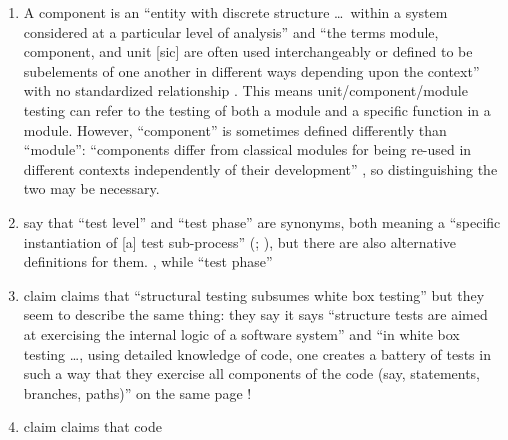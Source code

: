 \begin{enumerate}
    \item %
          A component is an ``entity with discrete structure \dots\ within a
          system considered at a particular level of analysis''
          \citep{ISO_IEC2023b} and ``the terms module, component, and unit
              [sic] are often used interchangeably or defined to be subelements
          of one another in different ways depending upon the context'' with
          no standardized relationship \citep[p.~82]{IEEE2017}. This means
          unit/component/module testing can refer to the testing of both a
          module and a specific function in a module.
          However, ``component'' is sometimes defined differently than
          ``module'': ``components differ from classical modules for being
          re-used in different contexts independently of their development''
          \citep[p.~107]{BaresiAndPezzè2006}, so distinguishing the two
          may be necessary.
          \ifnotpaper
    \item %
          \citeauthor*{IEEE2017} say that ``test level'' and ``test phase''
          are synonyms, both meaning a ``specific instantiation of [a] test
          sub-process'' (\citeyear[pp.~469,~470]{IEEE2017}; \citeyear[p.~9]{IEEE2013}),
          but there are also alternative definitions for them.
          \procLevel{\citeyearpar}, while ``test phase'' \phaseDef{}
          \fi
    \item %
           \citeauthor{PetersAndPedrycz2000} \ifnotpaper claim \else
              claims \fi that ``structural testing
          subsumes white box testing'' but they seem to describe the same thing:
          \ifnotpaper they say \else it says \fi ``structure tests are aimed at
          exercising the internal logic of a software system'' and ``in white box
          testing \dots, using detailed knowledge of code, one creates a battery of
          tests in such a way that they exercise all components of the code
          (say, statements, branches, paths)'' on the same page
          \citeyearpar[p.~447]{PetersAndPedrycz2000}!
    \item %
           \citetISTQB{} \ifnotpaper claim \else claims \fi that code

\end{enumerate}
